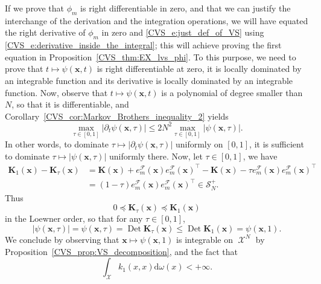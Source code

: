 \documentclass[twoside,11pt]{book}
\numberwithin{theorem}{chapter}
\numberwithin{definition}{chapter}
\numberwithin{proposition}{chapter}
\numberwithin{corollary}{chapter}
\numberwithin{example}{chapter}
\numberwithin{lemma}{chapter}
\numberwithin{assumption}{chapter}
\DeclareMathOperator{\Det}{Det}
\DeclareMathOperator{\Tran}{\intercal}
\DeclareMathOperator{\X}{\mathcal{X}}
\begin{document}
 If we prove that $\phi_{m}$ is right differentiable in zero, and that we can justify the interchange of the derivation and the integration operations, we will have equated the right derivative of $\phi_m$ in zero and \eqref{CVS_e:just_def_of_VS} using \eqref{CVS_e:derivative_inside_the_integral}; this will achieve proving the first equation in Proposition~\ref{CVS_thm:EX_lvs_phi}. To this purpose, we need to prove that $t \mapsto \psi(\bm{x},t)$ is right differentiable at zero, it is locally dominated by an integrable function and its derivative is locally dominated by an integrable function. Now, observe that $t \mapsto \psi(\bm{x},t)$ is a polynomial of degree smaller than $N$, so that it is differentiable, and Corollary~\ref{CVS_cor:Markov_Brothers_inequality_2} yields
\begin{equation}
\max_{\tau \in [0,1]} \left|\partial_t \psi(\bm{x},\tau)\right| \leq 2N^{2} \max_{\tau \in [0,1]} \left|\psi(\bm{x},\tau)\right|.
\end{equation}
 In other words, to dominate $\tau \mapsto |\partial_t \psi(\bm{x},\tau)|$ uniformly on $[0,1]$, it is sufficient to dominate $\tau \mapsto| \psi(\bm{x},\tau)|$ uniformly there. Now, let $\tau \in [0,1]$, we have
\begin{align}
\bm{K}_{1}(\bm{x}) - \bm{K}_{\tau}(\bm{x}) &  = \bm{K}(\bm{x}) + e_{m}^{\mathcal{F}}(\bm{x})e_{m}^{\mathcal{F}}(\bm{x})^{\Tran} - \bm{K}(\bm{x}) - \tau e_{m}^{\mathcal{F}}(\bm{x})e_{m}^{\mathcal{F}}(\bm{x})^{\Tran}\\
& = (1-\tau)e_{m}^{\mathcal{F}}(\bm{x})e_{m}^{\mathcal{F}}(\bm{x})^{\Tran} \in \mathcal{S}_{N}^{+}.
\end{align}
Thus
\begin{equation}
0\preceq \bm{K}_{\tau}(\bm{x}) \preceq \bm{K}_{1}(\bm{x})
\end{equation}
in the Loewner order, so that for any $\tau\in [0,1]$,
\begin{equation}
|\psi(\bm{x},\tau)| = \psi(\bm{x},\tau) =\Det \bm{K}_{\tau}(\bm{x}) \leq \Det \bm{K}_{1}(\bm{x}) = \psi(\bm{x},1) .
\end{equation}
We conclude by observing that $\bm{x} \mapsto \psi(\bm{x},1)$ is integrable on $\X^{N}$ by Proposition~\ref{CVS_prop:VS_decomposition}, and the fact that
\begin{equation}
\int_{\X} k_{1}(x,x) \mathrm{d}\omega(x) < +\infty.
\end{equation}
\end{document}
